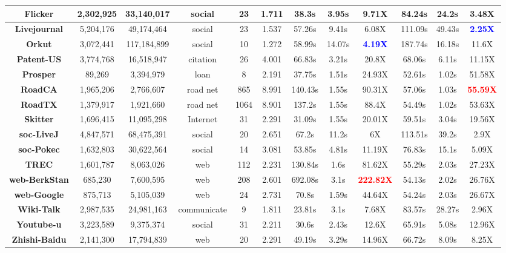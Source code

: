 \begin{table}[!t]
\begin{tabular}{c|c|c|c|c|c|c|c|c|c|c|c}
		\hline
		\textbf{Flicker} & 2,302,925 & 33,140,017 & social & 23 & 1.711 & 38.3s & 3.95s & 9.71X & 84.24s & 24.2s & 3.48X \\
		\hline
		\textbf{Livejournal} & 5,204,176 & 49,174,464 & social & 23 & 1.537 & 57.26s & 9.41s & 6.08X & 111.09s & 49.43s & \textcolor{blue}{\textbf{2.25X}} \\
		\hline
		\textbf{Orkut} & 3,072,441 & 117,184,899 & social & 10 & 1.272 & 58.99s & 14.07s & \textcolor{blue}{\textbf{4.19X}} & 187.74s & 16.18s & 11.6X \\
		\hline
		\textbf{Patent-US} & 3,774,768 & 16,518,947 & citation & 26 & 4.001 & 66.83s & 3.21s & 20.8X & 68.06s & 6.11s & 11.15X \\
		\hline
		\textbf{Prosper} & 89,269 & 3,394,979 & loan & 8 & 2.191 & 37.75s & 1.51s & 24.93X & 52.61s & 1.02s & 51.58X \\
		\hline
		\textbf{RoadCA} & 1,965,206 & 2,766,607 & road net & 865 & 8.991 & 140.43s & 1.55s & 90.31X & 57.06s & 1.03s & \textcolor{red}{\textbf{55.59X}} \\
		\hline
		\textbf{RoadTX} & 1,379,917 & 1,921,660 & road net & 1064 & 8.901 & 137.2s & 1.55s & 88.4X & 54.49s & 1.02s & 53.63X \\
		\hline
		\textbf{Skitter} & 1,696,415 & 11,095,298 & Internet & 31 & 2.291 & 31.09s & 1.55s & 20.01X & 59.51s & 3.04s & 19.56X \\
		\hline
		\textbf{soc-LiveJ} & 4,847,571 & 68,475,391 & social & 20 & 2.651 & 67.2s & 11.2s & 6X & 113.51s & 39.2s & 2.9X \\
		\hline
		\textbf{soc-Pokec} & 1,632,803 & 30,622,564 & social & 14 & 3.081 & 53.85s & 4.81s & 11.19X & 76.83s & 15.1s & 5.09X \\
		\hline
		\textbf{TREC} & 1,601,787 & 8,063,026 & web & 112 & 2.231 & 130.84s & 1.6s & 81.62X & 55.29s & 2.03s & 27.23X \\
		\hline
		\textbf{\footnotesize{web-BerkStan}} & 685,230 & 7,600,595 & web & 208 & 2.601 & 692.08s & 3.1s & \textcolor{red}{\textbf{222.82X}} & 54.13s & 2.02s & 26.76X \\
		\hline
		\textbf{web-Google} & 875,713 & 5,105,039 & web & 24 & 2.731 & 70.8s & 1.59s & 44.64X & 54.24s & 2.03s & 26.67X \\
		\hline
		\textbf{Wiki-Talk} & 2,987,535 & 24,981,163 & \footnotesize{communicate} & 9 & 1.811 & 23.81s & 3.1s & 7.68X & 83.57s & 28.27s & 2.96X \\
		\hline
		\textbf{Youtube-u} & 3,223,589  & 9,375,374 & social & 31 & 2.211 & 30.6s & 2.43s & 12.6X & 65.91s & 5.08s & 12.96X \\
		\hline
		\textbf{\footnotesize{Zhishi-Baidu}} & 2,141,300 & 17,794,839 & web & 20 & 2.291 & 49.19s & 3.29s & 14.96X & 66.72s & 8.09s & 8.25X\\
		\hline
	\end{tabular}
	\vspace{-0.1in}
\end{table}
